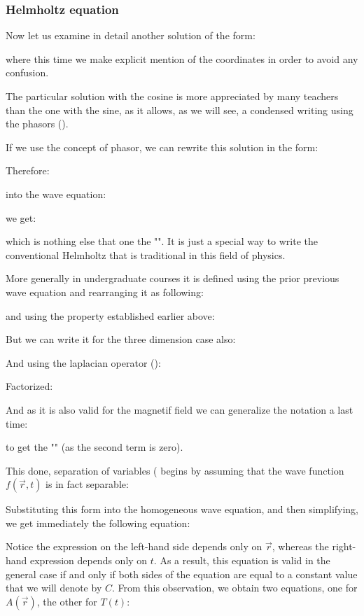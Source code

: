 	
	\subsubsection{Helmholtz equation}
	Now let us examine in detail another solution of the form:
	
	where this time we make explicit mention of the coordinates in order to avoid any confusion.
	\begin{tcolorbox}[title=Remarks,colframe=black,arc=10pt]
	The particular solution with the cosine is more appreciated by many teachers than the one with the sine, as it allows, as we will see, a condensed writing using the phasors ().
	\end{tcolorbox}
	If we use the concept of phasor, we can rewrite this solution in the form:
	
	Therefore:
	
	into the wave equation:
	
	we get:
	
	which is nothing else that one the "". It is just a special way to write the conventional Helmholtz that is traditional in this field of physics.

	More generally in undergraduate courses it is defined using the prior previous wave equation and rearranging it as following:
	
	and using the property established earlier above:
	
	But we can write it for the three dimension case also:
	
	And using the laplacian operator ():
	
	Factorized:
	
	And as it is also valid for the magnetif field we can generalize the notation a last time:
	
	to get the "" (as the second term is zero).

	This done, separation of variables ( begins by assuming that the wave function $f(\vec{r}, t)$ is in fact separable:
	
	Substituting this form into the homogeneous wave equation, and then simplifying, we get immediately the following equation:
	
	Notice the expression on the left-hand side depends only on $\vec{r}$, whereas the right-hand expression depends only on $t$. As a result, this equation is valid in the general case if and only if both sides of the equation are equal to a constant value that we will denote by $C$. From this observation, we obtain two equations, one for $A(\vec{r})$, the other for $T(t)$:
	
